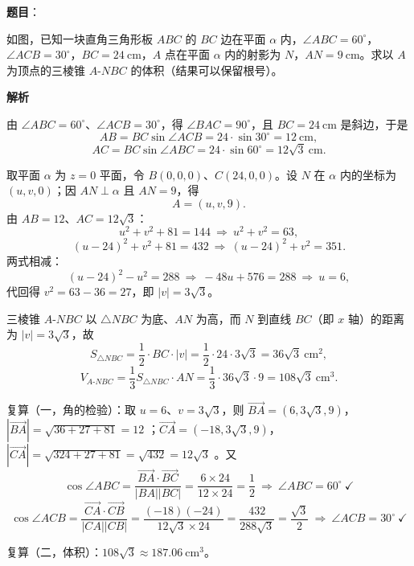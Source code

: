 \begin{answer}

\textbf{题目}：

如图，已知一块直角三角形板 $ABC$ 的 $BC$ 边在平面 $\alpha$ 内，$\angle ABC=60^\circ$，$\angle ACB=30^\circ$，$BC=24\ \mathrm{cm}$，$A$ 点在平面 $\alpha$ 内的射影为 $N$，$AN=9\ \mathrm{cm}$。求以 $A$ 为顶点的三棱锥 $A\text{-}NBC$ 的体积（结果可以保留根号）。
\nopagebreak[4]
\begin{center}\end{center}
\nopagebreak[4]
\textbf{解析}
\nopagebreak[4]
\begin{center}\end{center}
\nopagebreak[4]
由 $\angle ABC=60^\circ$、$\angle ACB=30^\circ$，得 $\angle BAC=90^\circ$，且 $BC=24\ \mathrm{cm}$ 是斜边，于是
\nopagebreak[4]
\[
AB=BC\sin\angle ACB=24\cdot\sin30^\circ=12\ \mathrm{cm},
\]
\nopagebreak[4]
\[
AC=BC\sin\angle ABC=24\cdot\sin60^\circ=12\sqrt3\ \mathrm{cm}.
\]

取平面 $\alpha$ 为 $z=0$ 平面，令 $B(0,0,0)$、$C(24,0,0)$。设 $N$ 在 $\alpha$ 内的坐标为 $(u,v,0)$；因 $AN\perp\alpha$ 且 $AN=9$，得
\nopagebreak[4]
\[
A=(u,v,9).
\]
由 $AB=12$、$AC=12\sqrt3$：
\nopagebreak[4]
\[
u^2+v^2+81=144\ \Longrightarrow\ u^2+v^2=63,
\]
\nopagebreak[4]
\[
(u-24)^2+v^2+81=432\ \Longrightarrow\ (u-24)^2+v^2=351.
\]
两式相减：
\nopagebreak[4]
\[
(u-24)^2-u^2=288\ \Longrightarrow\ -48u+576=288\ \Longrightarrow\ u=6,
\]
代回得 $v^2=63-36=27$，即 $|v|=3\sqrt3$。

三棱锥 $A\text{-}NBC$ 以 $\triangle NBC$ 为底、$AN$ 为高，而 $N$ 到直线 $BC$（即 $x$ 轴）的距离为 $|v|=3\sqrt3$，故
\nopagebreak[4]
\[
S_{\triangle NBC}=\frac12\cdot BC\cdot|v|=\frac12\cdot24\cdot3\sqrt3=36\sqrt3\ \mathrm{cm}^2,
\]
\nopagebreak[4]
\[
V_{A\text{-}NBC}=\frac13S_{\triangle NBC}\cdot AN=\frac13\cdot36\sqrt3\cdot9=108\sqrt3\ \mathrm{cm}^3.
\]

复算（一，角的检验）：取 $u=6$、$v=3\sqrt3$，则 $\overrightarrow{BA}=(6,3\sqrt3,9)$，$|\overrightarrow{BA}|=\sqrt{36+27+81}=12$ ；$\overrightarrow{CA}=(-18,3\sqrt3,9)$，$|\overrightarrow{CA}|=\sqrt{324+27+81}=\sqrt{432}=12\sqrt3$ 。又
\nopagebreak[4]
\[
\cos\angle ABC=\frac{\overrightarrow{BA}\cdot\overrightarrow{BC}}{|BA||BC|}
=\frac{6\times24}{12\times24}=\frac12\ \Longrightarrow\ \angle ABC=60^\circ\ \checkmark
\]
\nopagebreak[4]
\[
\cos\angle ACB=\frac{\overrightarrow{CA}\cdot\overrightarrow{CB}}{|CA||CB|}
=\frac{(-18)(-24)}{12\sqrt3\times24}=\frac{432}{288\sqrt3}=\frac{\sqrt3}{2}\ \Longrightarrow\ \angle ACB=30^\circ\ \checkmark
\]

复算（二，体积）：$108\sqrt3\approx187.06\ \mathrm{cm}^3$。


\end{answer}
